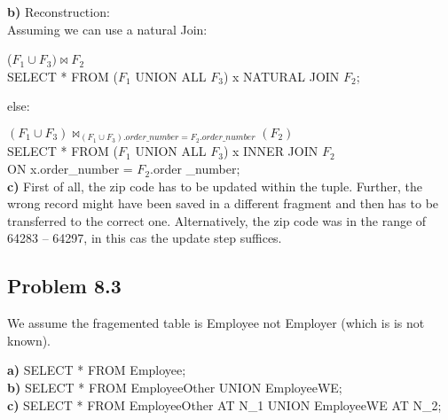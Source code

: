 \documentclass{scrartcl}
\begin{document}
\textbf{b)} Reconstruction: \\

Assuming we can use a natural Join:

($F_1 \cup F_3) \bowtie F_2$\\
SELECT * FROM ($F_1$ UNION ALL $F_3$) x NATURAL JOIN $F_2$;

else:

$(F_1 \cup F_3) \bowtie_{(F_1 \cup F_3).order\_number = F_2.order\_number} (F_2)$\\
SELECT * FROM ($F_1$ UNION ALL $F_3$) x INNER JOIN $F_2$ \\
ON x.order\_number = $F_2$.order \_number;\\



\textbf{c)} First of all, the zip code has to  be updated within the tuple. 
Further, the wrong record might have been saved in a different fragment and then has to be transferred to the correct one. 
Alternatively, the zip code was in the range of 64283 -- 64297, in this cas the update step suffices.
\subsection*{Problem 8.3}

We assume the fragemented table is Employee not Employer (which is is not known).

\textbf{a)} SELECT * FROM Employee; \\
\textbf{b)} SELECT * FROM EmployeeOther UNION EmployeeWE; \\
\textbf{c)} SELECT * FROM EmployeeOther AT N\_1 UNION EmployeeWE AT N\_2;
\end{document}
